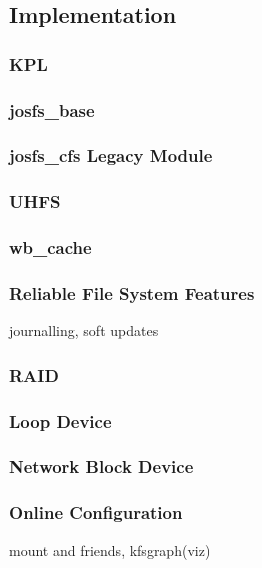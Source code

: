 \subsection{Implementation}
\label{subsec:impl}

\subsubsection{KPL}

\subsubsection{josfs\_base}

\subsubsection{josfs\_cfs Legacy Module}

\subsubsection{UHFS}

\subsubsection{wb\_cache}

\subsubsection{Reliable File System Features}
journalling, soft updates

\subsubsection{RAID}

\subsubsection{Loop Device}

\subsubsection{Network Block Device}

\subsubsection{Online Configuration}
mount and friends, kfsgraph(viz)
